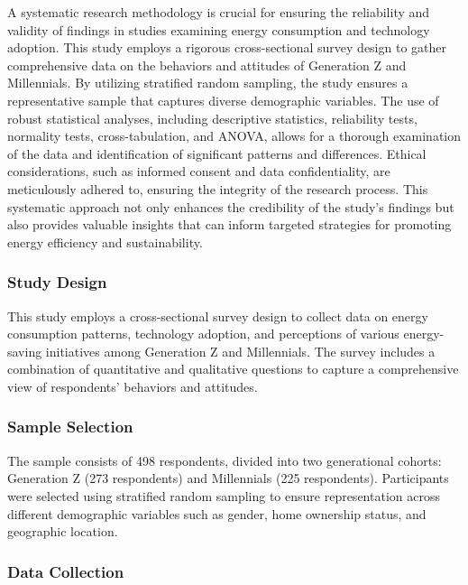 \documentclass[
  letterpaper,
  DIV=11,
  numbers=noendperiod]{scrartcl}
\begin{document}
A systematic research methodology is crucial for ensuring the
reliability and validity of findings in studies examining energy
consumption and technology adoption. This study employs a rigorous
cross-sectional survey design to gather comprehensive data on the
behaviors and attitudes of Generation Z and Millennials. By utilizing
stratified random sampling, the study ensures a representative sample
that captures diverse demographic variables. The use of robust
statistical analyses, including descriptive statistics, reliability
tests, normality tests, cross-tabulation, and ANOVA, allows for a
thorough examination of the data and identification of significant
patterns and differences. Ethical considerations, such as informed
consent and data confidentiality, are meticulously adhered to, ensuring
the integrity of the research process. This systematic approach not only
enhances the credibility of the study's findings but also provides
valuable insights that can inform targeted strategies for promoting
energy efficiency and sustainability.

\subsubsection{Study Design}\label{study-design}

This study employs a cross-sectional survey design to collect data on
energy consumption patterns, technology adoption, and perceptions of
various energy-saving initiatives among Generation Z and Millennials.
The survey includes a combination of quantitative and qualitative
questions to capture a comprehensive view of respondents' behaviors and
attitudes.

\subsubsection{Sample Selection}\label{sample-selection}

The sample consists of 498 respondents, divided into two generational
cohorts: Generation Z (273 respondents) and Millennials (225
respondents). Participants were selected using stratified random
sampling to ensure representation across different demographic variables
such as gender, home ownership status, and geographic location.

\subsubsection{Data Collection}\label{data-collection}
\end{document}
